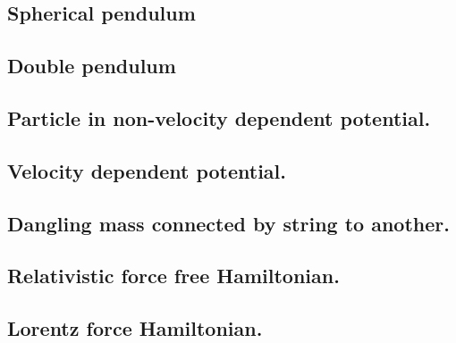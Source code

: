 \subsection{Spherical pendulum}

\subsection{Double pendulum}

\subsection{Particle in non-velocity dependent potential.}

\subsection{Velocity dependent potential.}

\subsection{Dangling mass connected by string to another.}

\subsection{Relativistic force free Hamiltonian.}

\subsection{Lorentz force Hamiltonian.}

\EndArticle
